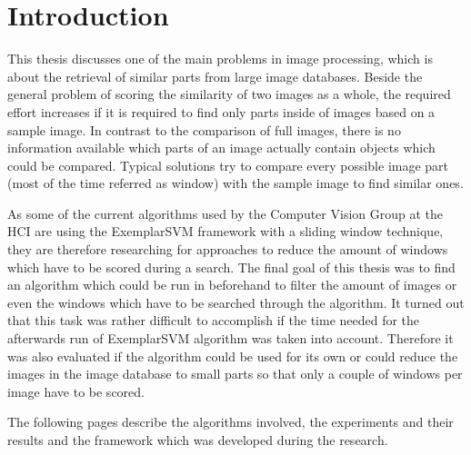 \chapter{Introduction}


This thesis discusses one of the main problems in image processing, which is about the retrieval of similar parts from large image databases.
Beside the general problem of scoring the similarity of two images as a whole, the required effort increases if it is required to find only parts inside of images based on a sample image. In contrast to the comparison of full images, there is no information available which parts of an image actually contain objects which could be compared.
Typical solutions try to compare every possible image part (most of the time referred as window) with the sample image to find similar ones.
\bigskip

As some of the current algorithms used by the Computer Vision Group at the \ac{HCI} are using the ExemplarSVM \cite{Malisiewicz2011} framework with a sliding window technique, they are therefore researching for approaches to reduce the amount of windows which have to be scored during a search. 
The final goal of this thesis was to find an algorithm which could be run in beforehand to filter the amount of images or even the windows which have to be searched through the algorithm. It turned out that this task was rather difficult to accomplish if the time needed for the afterwards run of ExemplarSVM algorithm was taken into account. Therefore it was also evaluated if the algorithm could be used for its own or could reduce the images in the image database to small parts so that only a couple of windows per image have to be scored.

The following pages describe the algorithms involved, the experiments and their results and the framework which was developed during the research.
